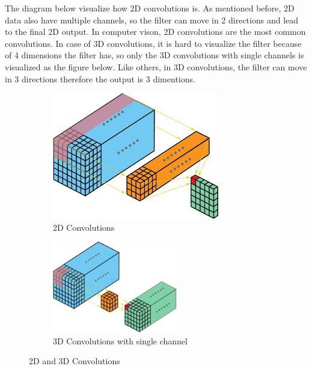\documentclass[a4paper, 12pt]{article}
\begin{document}
The diagram below visualize how 2D convolutions is. As mentioned before, 2D data also have multiple channels, so the filter can move in 2 directions and lead to the final 2D output. In computer vison, 2D convolutions are the most common convolutions. In case of 3D convolutions, it is hard to visualize the filter because of 4 dimensions the filter has, so only the 3D convolutions with single channels is visualized as the figure below. Like others, in 3D convolutions, the filter can move in 3 directions therefore the output is 3 dimentions.

\begin{figure}[H]
    \begin{subfigure}[b]{0.4\textwidth}
        \centering
        \includegraphics[width=0.8\textwidth]{2D Conv.png}
        \caption{2D Convolutions}
        \label{a}
    \end{subfigure}
    \hfill
    \begin{subfigure}[b]{0.6\textwidth}
        \centering
        \includegraphics[width=0.6\textwidth]{3D - single channel.png}
        \caption{3D Convolutions with single channel}
        \label{b}
    \end{subfigure}
    \hfill
    \caption{2D and 3D Convolutions}
    \label{Figure}
\end{figure}
\end{document}
